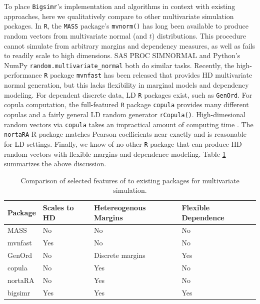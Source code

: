 \documentclass[
]{jss}
\begin{document}
To place \texttt{Bigsimr}'s implementation and algorithms in context with existing approaches, here we qualitatively compare to other multivariate simulation packages. In \texttt{R}, the \texttt{MASS} package's \texttt{mvnorm()} has long been available to produce random vectors from multivariate normal (and \(t\)) distributions. This procedure cannot simulate from arbitrary margins and dependency measures, as well as fails to readily scale to high dimensions. SAS PROC SIMNORMAL and Python's NumPy \texttt{random.multivariate\_normal} both do similar tasks. Recently, the high-performance \texttt{R} package \texttt{mvnfast} \citep{Fasiolo2016} has been released that provides HD multivariate normal generation, but this lacks flexibility in marginal models and dependency modeling. For dependent discrete data, LD \texttt{R} packages exist, such as \texttt{GenOrd}. For copula computation, the full-featured \texttt{R} package \texttt{copula} provides many different copulas and a fairly general LD random generator \texttt{rCopula()}. High-dimesional random vectors via \texttt{copula} takes an impractical amount of computing time \citep{Li2019gpu}. The \texttt{nortaRA} R package matches Pearson coefficients near exactly and is reasonable for LD settings. Finally, we know of no other \texttt{R} package that can produce HD random vectors with flexible margins and dependence modeling. Table \ref{tab:compare-table} summarizes the above discussion.

\begin{table}[h]
\centering
\caption{\label{tab:compare-table}Comparison of selected features of  to existing packages for multivariate simulation.}
\begin{tabular}{@{}llll@{}}
Package & Scales to HD & Hetereogenous Margins & Flexible Dependence \\ \midrule
MASS      & No           & No                    & No                  \\
mvnfast   & Yes          & No                    & No                  \\
GenOrd    & No           & Discrete margins      & Yes                 \\
copula    & No           & Yes                   & No                  \\
nortaRA   & No           & Yes                   & No                  \\
bigsimr   & Yes          & Yes                   & Yes                
\end{tabular}
\end{table}
\end{document}
